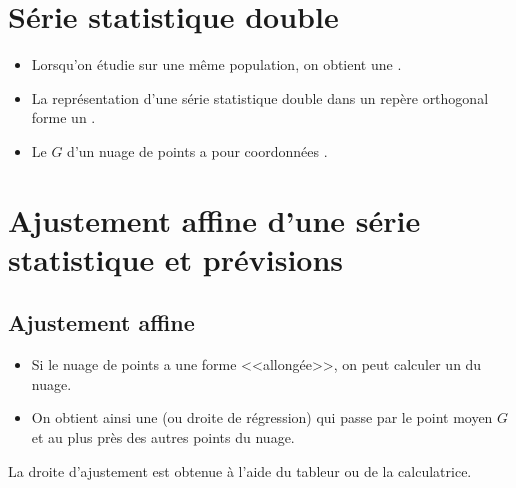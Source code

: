 \documentclass[12pt,a4paper]{article}
\date{}
\title{}
\begin{document}
{}

\section{Série statistique double}

\begin{mydefs}
	\begin{itemize}
		\item Lorsqu'on étudie  sur une même population, on obtient une .
		
		\item La représentation d'une série statistique double dans un repère orthogonal forme un .
		
		\item Le  $G$ d'un  nuage de points a pour coordonnées .
	\end{itemize}
	
\end{mydefs}



\newpage

\section{Ajustement affine d'une série statistique et prévisions}


\subsection{Ajustement affine}
\begin{mydefs}
	\begin{itemize}
		\item Si le nuage de points a une forme <<allongée>>, on peut calculer un  du nuage. 
		\item On obtient ainsi une  (ou droite de régression) qui passe par le point moyen $G$ et au plus près des autres points du nuage.		
	\end{itemize}
\end{mydefs}

\begin{mymeth}
	La droite d'ajustement est obtenue à l'aide du tableur ou de la calculatrice.
\end{mymeth}
\end{document}
